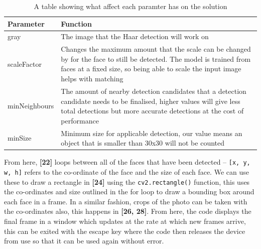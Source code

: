 \documentclass[9pt]{article}
\begin{document}
\begin{table}[H]
	\centering
	\begin{tabularx}{\textwidth}{lX}
		\textbf{Parameter} & \textbf{Function}                                                                                                                                                                                          \\ \midrule
		gray               & The image that the Haar detection will work on                                                                                                                                                             \\
		scaleFactor        & Changes the maximum amount that the scale can be changed by for the face to still be detected. The model is trained from faces at a fixed size, so being able to scale the input image helps with matching \\
		minNeighbours      & The amount of nearby detection candidates that a detection candidate needs to be finalised, higher values will give less total detections but more accurate detections at the cost of performance          \\
		minSize            & Minimum size for applicable detection, our value means an object that is smaller than 30x30 will not be counted                                                                                           \\ \bottomrule
	\end{tabularx}
	\caption{A table showing what affect each paramter has on the solution}
	\label{tab_haarParamsExplain}
\end{table}
From here, \textbf{[22]} loops between all of the faces that have been detected -- \texttt{[x, y, w, h]} refers to the co-ordinate of the face and the size of each face. We can use these to draw a rectangle in \textbf{[24]} using the \texttt{cv2.rectangle()} function, this uses the co-ordinates and size outlined in the for loop to draw a bounding box around each face in a frame. In a similar fashion, crops of the photo can be taken with the co-ordinates also, this happens in \textbf{[26, 28]}. From here, the code displays the final frame in a window which updates at the rate at which new frames arrive, this can be exited with the escape key where the code then releases the device from use so that it can be used again without error.
\end{document}

